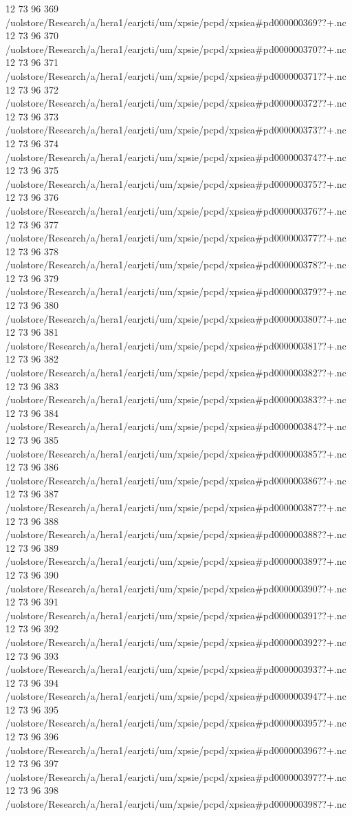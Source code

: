 12 73 96
369
/uolstore/Research/a/hera1/earjcti/um/xpsie/pcpd/xpsiea#pd000000369??+.nc
12 73 96
370
/uolstore/Research/a/hera1/earjcti/um/xpsie/pcpd/xpsiea#pd000000370??+.nc
12 73 96
371
/uolstore/Research/a/hera1/earjcti/um/xpsie/pcpd/xpsiea#pd000000371??+.nc
12 73 96
372
/uolstore/Research/a/hera1/earjcti/um/xpsie/pcpd/xpsiea#pd000000372??+.nc
12 73 96
373
/uolstore/Research/a/hera1/earjcti/um/xpsie/pcpd/xpsiea#pd000000373??+.nc
12 73 96
374
/uolstore/Research/a/hera1/earjcti/um/xpsie/pcpd/xpsiea#pd000000374??+.nc
12 73 96
375
/uolstore/Research/a/hera1/earjcti/um/xpsie/pcpd/xpsiea#pd000000375??+.nc
12 73 96
376
/uolstore/Research/a/hera1/earjcti/um/xpsie/pcpd/xpsiea#pd000000376??+.nc
12 73 96
377
/uolstore/Research/a/hera1/earjcti/um/xpsie/pcpd/xpsiea#pd000000377??+.nc
12 73 96
378
/uolstore/Research/a/hera1/earjcti/um/xpsie/pcpd/xpsiea#pd000000378??+.nc
12 73 96
379
/uolstore/Research/a/hera1/earjcti/um/xpsie/pcpd/xpsiea#pd000000379??+.nc
12 73 96
380
/uolstore/Research/a/hera1/earjcti/um/xpsie/pcpd/xpsiea#pd000000380??+.nc
12 73 96
381
/uolstore/Research/a/hera1/earjcti/um/xpsie/pcpd/xpsiea#pd000000381??+.nc
12 73 96
382
/uolstore/Research/a/hera1/earjcti/um/xpsie/pcpd/xpsiea#pd000000382??+.nc
12 73 96
383
/uolstore/Research/a/hera1/earjcti/um/xpsie/pcpd/xpsiea#pd000000383??+.nc
12 73 96
384
/uolstore/Research/a/hera1/earjcti/um/xpsie/pcpd/xpsiea#pd000000384??+.nc
12 73 96
385
/uolstore/Research/a/hera1/earjcti/um/xpsie/pcpd/xpsiea#pd000000385??+.nc
12 73 96
386
/uolstore/Research/a/hera1/earjcti/um/xpsie/pcpd/xpsiea#pd000000386??+.nc
12 73 96
387
/uolstore/Research/a/hera1/earjcti/um/xpsie/pcpd/xpsiea#pd000000387??+.nc
12 73 96
388
/uolstore/Research/a/hera1/earjcti/um/xpsie/pcpd/xpsiea#pd000000388??+.nc
12 73 96
389
/uolstore/Research/a/hera1/earjcti/um/xpsie/pcpd/xpsiea#pd000000389??+.nc
12 73 96
390
/uolstore/Research/a/hera1/earjcti/um/xpsie/pcpd/xpsiea#pd000000390??+.nc
12 73 96
391
/uolstore/Research/a/hera1/earjcti/um/xpsie/pcpd/xpsiea#pd000000391??+.nc
12 73 96
392
/uolstore/Research/a/hera1/earjcti/um/xpsie/pcpd/xpsiea#pd000000392??+.nc
12 73 96
393
/uolstore/Research/a/hera1/earjcti/um/xpsie/pcpd/xpsiea#pd000000393??+.nc
12 73 96
394
/uolstore/Research/a/hera1/earjcti/um/xpsie/pcpd/xpsiea#pd000000394??+.nc
12 73 96
395
/uolstore/Research/a/hera1/earjcti/um/xpsie/pcpd/xpsiea#pd000000395??+.nc
12 73 96
396
/uolstore/Research/a/hera1/earjcti/um/xpsie/pcpd/xpsiea#pd000000396??+.nc
12 73 96
397
/uolstore/Research/a/hera1/earjcti/um/xpsie/pcpd/xpsiea#pd000000397??+.nc
12 73 96
398
/uolstore/Research/a/hera1/earjcti/um/xpsie/pcpd/xpsiea#pd000000398??+.nc
